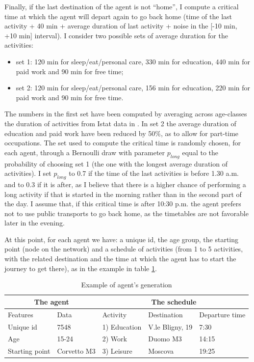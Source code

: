 Finally, if the last destination of the agent is not “home”, I compute a critical time at which the agent will depart again to go back home (time of the last activity + 40 min + average duration of last activity + noise in the [-10 min, +10 min] interval). I consider two possible sets of average duration for the activities:
\begin{itemize}
\item set 1: 120 min for sleep/eat/personal care, 330 min for education, 440 min for paid work and 90 min for free time;
\item set 2: 120 min for sleep/eat/personal care, 156 min for education, 220 min for paid work and 90 min for free time.
\end{itemize}
The numbers in the first set have been computed by averaging across age-classes the duration of activities from Istat data in \cite{site11}. In set 2 the average duration of education and paid work have been reduced by 50\%, as to allow for part-time occupations. 
The set used to compute the critical time is randomly chosen, for each agent, through a Bernoulli draw with parameter $p_{long}$ equal to the probability of choosing set 1 (the one with the longest average duration of activities). I set $p_{long}$ to 0.7 if the time of the last activities is before 1.30 a.m. and to 0.3 if it is after, as I believe that there is a higher chance of performing a long activity if that is started in the morning rather than in the second part of the day.
I assume that, if this critical time is after 10:30 p.m. the agent prefers not to use public transports to go back home, as the timetables are not favorable later in the evening. 


At this point, for each agent we have: a unique id, the age group, the starting point (node on the network) and a schedule of activities (from 1 to 5 activities, with the related destination and the time at which the agent has to start the journey to get there), as in the example in table \ref{tab1}. 


\begin{table}
\centering
\caption{Example of agent's generation}\label{tab1}
\begin{tabular}{ll|lll}
\multicolumn{2}{c|}{The agent} & \multicolumn{3}{c}{The schedule} \\ 
\toprule
Features      & Data      & Activity & Destination & Departure time \\ 
\midrule
Unique id & 7548 & 1) Education & V.le Bligny, 19 & 7:30\\
Age & 15-24  &  2) Work	& Duomo M3 & 14:15\\
Starting point & Corvetto M3 & 3) Leisure & Moscova & 19:25\\
\bottomrule
\end{tabular}
\end{table}

